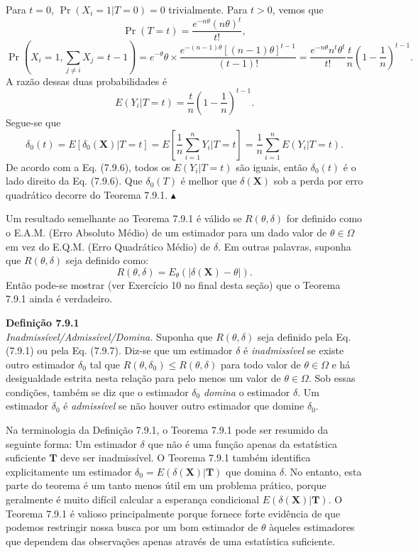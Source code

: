 Para $t=0$, $\Pr(X_i=1|T=0)=0$ trivialmente. Para $t>0$, vemos que
\[ \Pr(T=t) = \frac{e^{-n\theta}(n\theta)^t}{t!}, \]
\[ \Pr\left(X_i=1, \sum_{j \neq i} X_j=t-1\right) = e^{-\theta}\theta \times \frac{e^{-(n-1)\theta}[(n-1)\theta]^{t-1}}{(t-1)!} = \frac{e^{-n\theta} n^t \theta^t}{t!} \frac{t}{n} \left(1-\frac{1}{n}\right)^{t-1}. \]
A razão dessas duas probabilidades é
\begin{equation}
E(Y_i|T=t) = \frac{t}{n}\left(1-\frac{1}{n}\right)^{t-1}. \tag{7.9.6}
\end{equation}
Segue-se que
\[ \delta_0(t) = E[\delta_0(\mathbf{X})|T=t] = E\left[\frac{1}{n}\sum_{i=1}^{n} Y_i \Big| T=t \right] = \frac{1}{n}\sum_{i=1}^{n} E(Y_i|T=t). \]
De acordo com a Eq. (7.9.6), todos os $E(Y_i|T=t)$ são iguais, então $\delta_0(t)$ é o lado direito da Eq. (7.9.6). Que $\delta_0(T)$ é melhor que $\delta(\mathbf{X})$ sob a perda por erro quadrático decorre do Teorema 7.9.1. \hfill $\blacktriangle$

\vspace{\baselineskip}
Um resultado semelhante ao Teorema 7.9.1 é válido se $R(\theta, \delta)$ for definido como o E.A.M. (Erro Absoluto Médio) de um estimador para um dado valor de $\theta \in \Omega$ em vez do E.Q.M. (Erro Quadrático Médio) de $\delta$. Em outras palavras, suponha que $R(\theta, \delta)$ seja definido como:
\begin{equation}
R(\theta, \delta) = E_\theta(|\delta(\mathbf{X}) - \theta|). \tag{7.9.7}
\end{equation}
Então pode-se mostrar (ver Exercício 10 no final desta seção) que o Teorema 7.9.1 ainda é verdadeiro.

\noindent\textbf{Definição 7.9.1} \\
\textit{Inadmissível/Admissível/Domina.} Suponha que $R(\theta, \delta)$ seja definido pela Eq. (7.9.1) ou pela Eq. (7.9.7). Diz-se que um estimador $\delta$ é \textit{inadmissível} se existe outro estimador $\delta_0$ tal que $R(\theta, \delta_0) \le R(\theta, \delta)$ para todo valor de $\theta \in \Omega$ e há desigualdade estrita nesta relação para pelo menos um valor de $\theta \in \Omega$. Sob essas condições, também se diz que o estimador $\delta_0$ \textit{domina} o estimador $\delta$. Um estimador $\delta_0$ é \textit{admissível} se não houver outro estimador que domine $\delta_0$.

\vspace{\baselineskip}

Na terminologia da Definição 7.9.1, o Teorema 7.9.1 pode ser resumido da seguinte forma: Um estimador $\delta$ que não é uma função apenas da estatística suficiente $\mathbf{T}$ deve ser inadmissível. O Teorema 7.9.1 também identifica explicitamente um estimador $\delta_0 = E(\delta(\mathbf{X})|\mathbf{T})$ que domina $\delta$. No entanto, esta parte do teorema é um tanto menos útil em um problema prático, porque geralmente é muito difícil calcular a esperança condicional $E(\delta(\mathbf{X})|\mathbf{T})$. O Teorema 7.9.1 é valioso principalmente porque fornece forte evidência de que podemos restringir nossa busca por um bom estimador de $\theta$ àqueles estimadores que dependem das observações apenas através de uma estatística suficiente.


